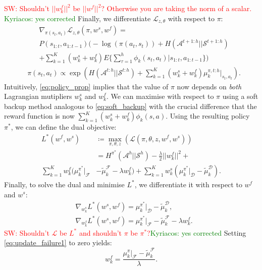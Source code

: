 \documentclass[letterpaper]{article}
\newcommand{\sw}[1]{\textcolor{red}{SW: #1}}
\newcommand{\ks}[1]{\textcolor{green}{Kyriacos: #1}}
\newcommand{\sw}[1]{}
\newcommand{\ks}[1]{}
\begin{document}
\sw{Shouldn't $||w^f_k||^2$ be $||w^f||^2$? Otherwise you are taking the norm of a scalar.} \ks{yes corrected}
Finally, we differentiate $\mathcal{L}_{z,\theta}$ with respect to $\pi$:
\begin{equation}
 \begin{split}
 &\nabla_{\pi(s_t,a_t)}\mathcal{L}_{z,\theta}(\pi,w^s,w^f) =\\
&P(s_{1:t},a_{1:t-1})\big(-\log(\pi(a_t,s_t))+ H(\mathcal{A}^{t+1:h}||\mathcal{S}^{t+1:h})\\
& +\sum\nolimits_{k=1}^K (w^s_k+ w^f_k)E\big\{\sum\nolimits_{\tau=1}^h \phi_k(s_t,a_t)|s_{1:t},a_{1:t-1}\big\}\big) \label{eqn:lagragian_derivative_failure}
 \end{split}
\end{equation}
\begin{equation}
\label{eq:policy_prop}
	\begin{split}
	&\pi(s_t,a_t) \propto \exp\left(H(\mathcal{A}^{t:h}||\mathcal{S}^{t:h})+\sum^K_{k=1}(w^s_k + w^f_k)\mu_k^{\pi,t:h}|_{s_t,a_t}\right).
	\end{split}
\end{equation}
Intuitively, \eqref{eq:policy_prop} implies that the value of $\pi$ now depends on \emph{both} Lagrangian mutipliers $w^s_k$ and $w^f_k$.  We can maximise with respect to $\pi$ using a soft backup method analogous to \eqref{eq:soft_backup} with the crucial difference that the reward function is now $\sum_{k=1}^K(w^s_k + w^f_k)\phi_k(s,a)$.  Using the resulting policy $\pi^*$, we can define the dual objective:
\begin{equation}
	\begin{split}
	L^*(w^f,w^s) &\coloneqq\max_{\pi,\theta,z}\left(\mathcal{L}(\pi,\theta,z,w^f,w^s)\right)\\
				  &= H^{\pi^*}(\mathcal{A}^h||\mathcal{S}^h) - \frac{\lambda}{2}||w^f_k||^2 +\\ 
				\sum_{k=1}^Kw^f_k (\mu^{\pi^*}_k|_{\mathcal{F}}& -\widetilde{\mu}^{\mathcal{F}}_k-\lambda w^f_k) + \sum_{k=1}^Kw^s_k(\mu^{\pi^*}_k|_{\mathcal{D}}-\widetilde{\mu}^{\mathcal{D}}_k).
	\end{split}
	\label{eq:partial_objective_failure}
\end{equation}
Finally, to solve the dual and minimise $L^*$, we differentiate it with respect to $w^f$ and $w^s$:
\begin{align}
	&\nabla_{w^s_k}L^*(w^s,w^f) = \mu^{\pi^*}_ k|_{\mathcal{D}}- \widetilde{\mu}^{\mathcal{D}}_k \label{eq:update_success},\\
		&\nabla_{w^f_k}L^*(w^s,w^f) = \mu^{\pi^*}_k|_{\mathcal{F}} - \widetilde{\mu}^{\mathcal{F}}_k - \lambda w^f_k. \label{eq:update_failure1}
\end{align}
\sw{Shouldn't $\mathcal{L}$ be $L^*$ and shouldn't $\pi$ be $\pi^*$?}\ks{yes corrected}
Setting \eqref{eq:update_failure1} to zero yields:
\begin{equation}
  \label{eq:update_failure2}
  w^f_k = \frac{\mu^{\pi}_k|_{\mathcal{F}} - \widetilde{\mu}^{\mathcal{F}}_k}{\lambda}.
\end{equation}
%
\end{document}
